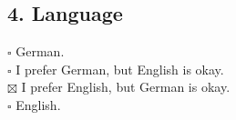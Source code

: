 \documentclass{scrartcl}
\begin{document}
\subsection*{4. Language}
$\square$ German.\\
$\square$ I prefer German, but English is okay.\\
$\boxtimes$ I prefer English, but German is okay.\\
$\square$ English.\\
\end{document}
